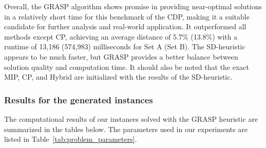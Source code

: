 \documentclass{article}
\begin{document}
Overall, the GRASP algorithm shows promise in providing near-optimal solutions in a relatively short time for this benchmark of the CDP, making it a suitable candidate for further analysis and real-world application. It outperformed all methods except CP, achieving an average distance of 5.7\% (13.8\%) with a runtime of 13,186 (574,983) milliseconds for Set A (Set B). The SD-heuristic appears to be much faster, but GRASP provides a better balance between solution quality and computation time. It should also be noted that the exact MIP, CP, and Hybrid are initialized with the results of the SD-heuristic.


\subsubsection{Results for the generated instances}

The computational results of our instances solved with the GRASP heuristic are summarized in the tables below. %
The parameters used in our experiments are listed in Table~\ref*{tab:problem_parameters}.
\end{document}
